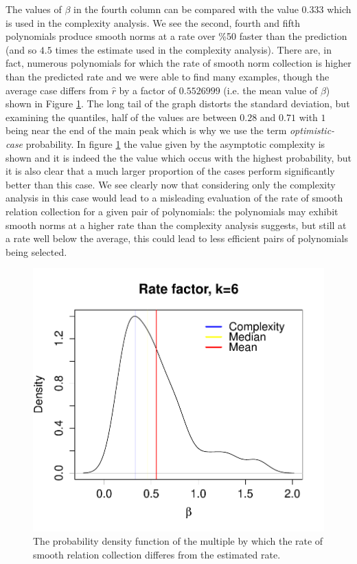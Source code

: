 \documentclass[a4paper, 10pt, envcountsect, runningheads]{article}
\numberwithin{figure}{section}
\numberwithin{equation}{section}
\begin{document}
The values of $\beta$ in the fourth column can be compared with the value $0.33\hat{3}$ which is used in the complexity analysis. We see the second, fourth and fifth polynomials produce smooth norms at a rate over \%50 faster than the prediction (and so $4.5$ times the estimate used in the complexity analysis). There are, in fact, numerous polynomials for which the rate of smooth norm collection is higher than the predicted rate and we were able to find many examples, though the average case differs from $\hat{r}$ by a factor of $0.5526999$ (i.e. the mean value of $\beta$) shown in Figure \ref{fig:mults}. The long tail of the graph distorts the standard deviation, but examining the quantiles, half of the values are between $0.28$ and $0.71$ with $1$ being near the end of the main peak which is why we use the term {\em optimistic-case} probability. In figure \ref{fig:mults} the value given by the asymptotic complexity is shown and it is indeed the the value which occus with the highest probability, but it is also clear that a much larger proportion of the cases perform significantly better than this case. We see clearly now that considering only the complexity analysis in this case would lead to a misleading evaluation of the rate of smooth relation collection for a given pair of polynomials: the polynomials may exhibit smooth norms at a higher rate than the complexity analysis suggests, but still at a rate well below the average, this could lead to less efficient pairs of polynomials being selected.

\begin{center}
\begin{figure}\label{fig:mults}
\includegraphics[scale=0.80]{graphs/multiple_tests_plot}\caption{The probability density function of the multiple by which the rate of smooth relation collection differes from the estimated rate.}
\end{figure}
\end{center}
\end{document}
